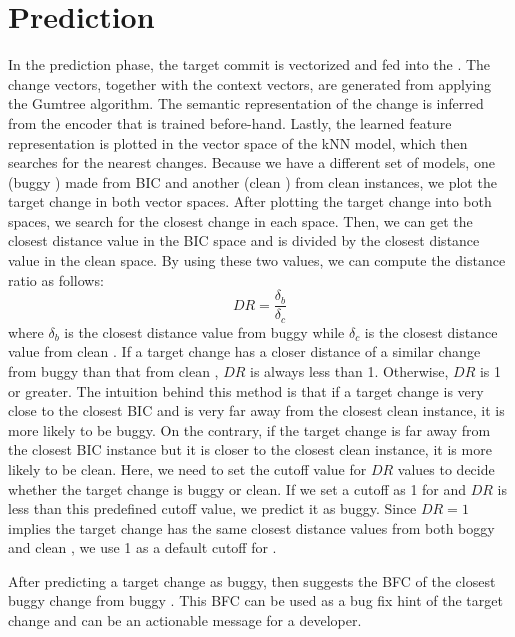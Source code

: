 \section{Prediction}
In the prediction phase, the target commit is vectorized and fed into the {\simfin}.
The change vectors, together with the context vectors, are generated from applying the Gumtree algorithm.
The semantic representation of the change is inferred from the encoder that is trained before-hand.
Lastly, the learned feature representation is plotted in the vector space of the kNN model, which then searches for the nearest changes.
Because we have a different set of models, one (buggy {\simfin}) made from BIC and another (clean \simfin) from clean instances, we plot the target change in both vector spaces.
After plotting the target change into both spaces, we search for the closest change in each space.
Then, we can get the closest distance value in the BIC space and is divided by the closest distance value in the clean space.
By using these two values, we can compute the distance ratio as follows:
\begin{equation}
    DR = \frac{\delta_b}{\delta_c}
\end{equation}
where $\delta_b$ is the closest distance value from buggy {\simfin} while $\delta_c$ is the closest distance value from clean {\simfin}.
If a target change has a closer distance of a similar change from buggy {\simfin} than that from clean {\simfin}, $DR$ is always less than 1. Otherwise, $DR$ is 1 or greater.
The intuition behind this method is that if a target change is very close to the closest BIC and is very far away from the closest clean instance, it is more likely to be buggy.
On the contrary, if the target change is far away from the closest BIC instance but it is closer to the closest clean instance, it is more likely to be clean.
Here, we need to set the cutoff value for $DR$ values to decide whether the target change is buggy or clean.
If we set a cutoff as 1 for {\simfinmo} and $DR$ is less than this predefined cutoff value, we predict it as buggy.
Since $DR=1$ implies the target change has the same closest distance values from both boggy and clean {\simfin}, we use 1 as a default cutoff for {\simfinmo}.

After predicting a target change as buggy, then {\simfinmo} suggests the BFC of the closest buggy change from buggy {\simfin}.
This BFC can be used as a bug fix hint of the target change and can be an actionable message for a developer.